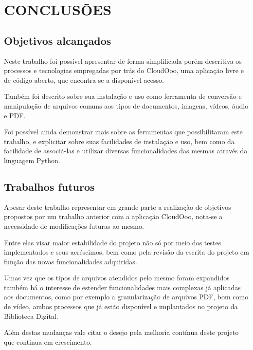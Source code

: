 \chapter{CONCLUSÕES}
\thispagestyle{empty}

\section{Objetivos alcançados}

Neste trabalho foi possível apresentar de forma simplificada porém descritiva os processos e tecnologias empregadas por trás do CloudOoo, uma aplicação livre e de código aberto, que encontra-se a disponível acesso.

Também foi descrito sobre sua instalação e uso como ferramenta de conversão e manipulação de arquivos comuns aos tipos de documentos, imagens, vídeos, áudio e PDF.

Foi possível ainda demonstrar mais sobre as ferramentas que possibilitaram este trabalho, e explicitar sobre suas facilidades de instalação e uso, bem como da facilidade de associá-las e utilizar diversas funcionalidades das mesmas através da linguagem Python.

\section{Trabalhos futuros}

Apesar deste trabalho representar em grande parte a realização de objetivos propostos por um trabalho anterior com a aplicação CloudOoo, nota-se a necessidade de modificações futuras ao mesmo.

Entre elas visar maior estabilidade do projeto não só por meio dos testes implementados e seus acréscimos, bem como pela revisão da escrita do projeto em função das novas funcionalidades adquiridas.

Umas vez que os tipos de arquivos atendidos pelo mesmo foram expandidos também há o interesse de estender funcionalidades mais complexas já aplicadas aos documentos, como por exemplo a granularização de arquivos PDF, bom como de vídeo, ambos processos que já estão disponível e implantados no projeto da Biblioteca Digital.

Além destas mudanças vale citar o desejo pela melhoria contínua deste projeto que continua em crescimento.
